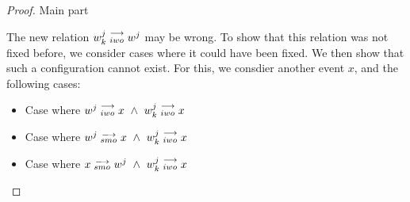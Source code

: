 \begin{proof}{Main part}
\begin{itemize}
                        The new relation $w_k^j\stackrel{\longrightarrow}{_{iwo}}w^j$ may be wrong. 
                        To show that this relation was not fixed before, we consider cases where it could have been fixed. We then show that such a configuration cannot exist. For this, we consdier another event $x$, and the following cases:

                        \begin{itemize}
                            \item Case where $w^j\stackrel{\longrightarrow}{_{iwo}}x \ \wedge \ w_k^j\stackrel{\longrightarrow}{_{iwo}}x$


                            \item Case where $w^j\stackrel{\longrightarrow}{_{smo}}x \ \wedge \ w_k^j\stackrel{\longrightarrow}{_{iwo}}x$


                            \item Case where $x\stackrel{\longrightarrow}{_{smo}}w^j \ \wedge \ w_k^j\stackrel{\longrightarrow}{_{iwo}}x$

                            

\end{itemize}
\end{itemize}
\end{proof}
